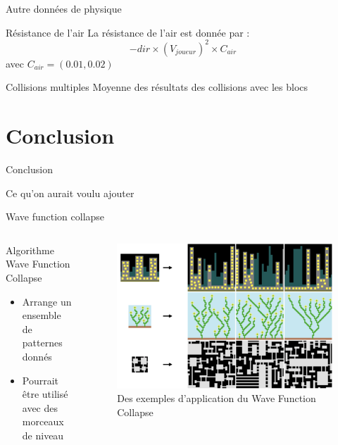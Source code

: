 \documentclass{beamer}
\begin{document}
{\begin{frame}{Autre données de physique}
    \begin{block}{Résistance de l'air}
        La résistance de l'air est donnée par :
        \[
         -dir \times (V_{joueur})^2 \times C_{air}
        \]
        avec \(C_{air} = (0.01,0.02)\)
    \end{block}

    \begin{block}{Collisions multiples}
        Moyenne des résultats des collisions avec les blocs
    \end{block}

\end{frame}

\section{Conclusion}
\begin{frame}{Conclusion}

\end{frame}

\begin{frame}{Ce qu'on aurait voulu ajouter}

\end{frame}

\begin{frame}{Wave function collapse}
    \begin{columns}
        \begin{block}{Algorithme Wave Function Collapse}
            \begin{itemize}
                \item[\bullet] Arrange un ensemble de patternes donnés
                \item[\bullet] Pourrait être utilisé avec des morceaux de niveau
            \end{itemize}
        \end{block}
        \begin{figure}
            \centering
            \includegraphics[width=1.0\textwidth]{images/wfc-examples}
            \caption{Des exemples d'application du Wave Function Collapse}
        \end{figure}
    \end{columns}
\end{frame}

}
\end{document}
